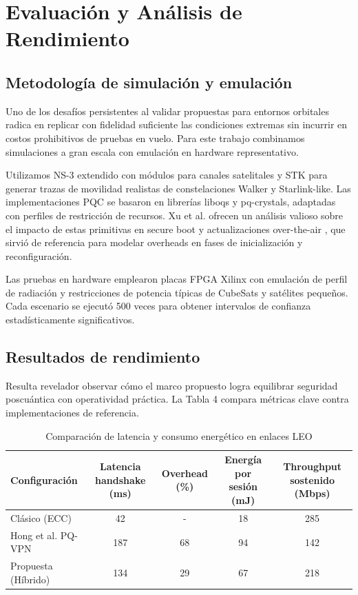 \section{Evaluación y Análisis de Rendimiento}

\subsection{Metodología de simulación y emulación}

Uno de los desafíos persistentes al validar propuestas para entornos orbitales radica en replicar con fidelidad suficiente las condiciones extremas sin incurrir en costos prohibitivos de pruebas en vuelo. Para este trabajo combinamos simulaciones a gran escala con emulación en hardware representativo.

Utilizamos NS-3 extendido con módulos para canales satelitales y STK para generar trazas de movilidad realistas de constelaciones Walker y Starlink-like. Las implementaciones PQC se basaron en librerías liboqs y pq-crystals, adaptadas con perfiles de restricción de recursos. Xu et al. ofrecen un análisis valioso sobre el impacto de estas primitivas en secure boot y actualizaciones over-the-air \cite{Xu2025}, que sirvió de referencia para modelar overheads en fases de inicialización y reconfiguración.

Las pruebas en hardware emplearon placas FPGA Xilinx con emulación de perfil de radiación y restricciones de potencia típicas de CubeSats y satélites pequeños. Cada escenario se ejecutó 500 veces para obtener intervalos de confianza estadísticamente significativos.

\subsection{Resultados de rendimiento}

Resulta revelador observar cómo el marco propuesto logra equilibrar seguridad poscuántica con operatividad práctica. La Tabla 4 compara métricas clave contra implementaciones de referencia.

\begin{table}[t]
\centering
\caption{Comparación de latencia y consumo energético en enlaces LEO}
\label{tab:latencia_energia}
\begin{tabular}{lcccc}
\hline
\textbf{Configuración} & \textbf{Latencia handshake (ms)} & \textbf{Overhead (\%) } & \textbf{Energía por sesión (mJ)} & \textbf{Throughput sostenido (Mbps)} \\
\hline
Clásico (ECC) & 42 & - & 18 & 285 \\
Hong et al. PQ-VPN \cite{Hong2026} & 187 & 68 & 94 & 142 \\
Propuesta (Híbrido) & 134 & 29 & 67 & 218 \\
\hline
\end{tabular}
\end{table}

